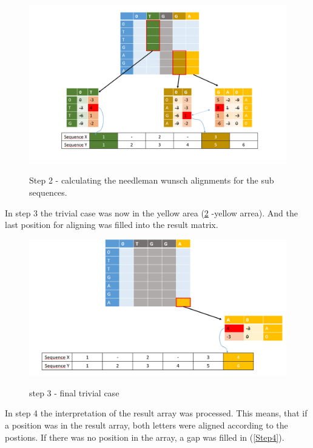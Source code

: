 \documentclass[%
   10pt,              %
   nenglish,           %
   a4paper,           %
   DIV11,             %
]{scrartcl}%
\begin{document}
  \begin{figure}[h]
   	\includegraphics[scale=0.25]{img/Hirschberg_Step2.png}
   	\label{Step2}
   	\caption{Step 2 - calculating the needleman wunsch alignments for the sub sequences.}
  \end{figure}
  
  In step 3 the trivial case was now in the yellow area (\ref{Step3} -yellow arrea). And the last position for aligning was filled into the result matrix. 
 
  \begin{figure}[h]
    \includegraphics[scale=0.25]{img/Hirschberg_Step3.png}
	\label{Step3}
	\caption{step 3 - final trivial case}
  \end{figure}
    
    In step 4 the interpretation of the result array was processed. This means, that if a position was in the result array, both letters were aligned according to the postions. If there was no position in the array, a gap was filled in (\ref{Step4}).
    
\end{document}
